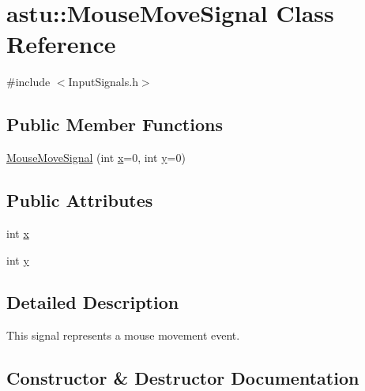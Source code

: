\hypertarget{classastu_1_1MouseMoveSignal}{}\section{astu\+:\+:Mouse\+Move\+Signal Class Reference}
\label{classastu_1_1MouseMoveSignal}


{\ttfamily \#include $<$Input\+Signals.\+h$>$}

\subsection*{Public Member Functions}
\begin{DoxyCompactItemize}
\item 
\hyperlink{classastu_1_1MouseMoveSignal_a9b93cf85705aa21137cf4c24e747285f}{Mouse\+Move\+Signal} (int \hyperlink{classastu_1_1MouseMoveSignal_a9d52ac7539de0cb742b6e3c0d699a471}{x}=0, int \hyperlink{classastu_1_1MouseMoveSignal_afc06dfa5666fb4760e42ab1e1cce7074}{y}=0)
\end{DoxyCompactItemize}
\subsection*{Public Attributes}
\begin{DoxyCompactItemize}
\item 
int \hyperlink{classastu_1_1MouseMoveSignal_a9d52ac7539de0cb742b6e3c0d699a471}{x}
\item 
int \hyperlink{classastu_1_1MouseMoveSignal_afc06dfa5666fb4760e42ab1e1cce7074}{y}
\end{DoxyCompactItemize}


\subsection{Detailed Description}
This signal represents a mouse movement event. 

\subsection{Constructor \& Destructor Documentation}
\mbox{\label{classastu_1_1MouseMoveSignal_a9b93cf85705aa21137cf4c24e747285f}} 
